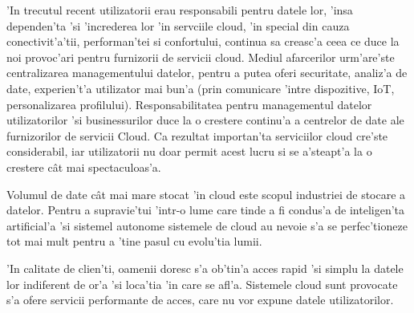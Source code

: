 \documentclass[12pt,a4paper,twoside]{report}
\begin{document}
'In trecutul recent utilizatorii erau responsabili pentru datele lor, 'insa dependen'ta 'si 'increderea lor 'in servciile cloud, 'in special din  cauza conectivit'a'tii, performan'tei si confortului, continua sa creasc'a ceea ce duce la noi provoc'ari pentru furnizorii de servicii cloud. Mediul afarcerilor urm'are'ste centralizarea managementului datelor, pentru a putea oferi securitate, analiz'a de date, experien't'a utilizator mai bun'a (prin comunicare 'intre dispozitive, IoT, personalizarea profilului). Responsabilitatea pentru managementul datelor utilizatorilor 'si businessurilor duce la o crestere continu'a a centrelor de date ale furnizorilor de servicii Cloud. Ca rezultat importan'ta serviciilor cloud cre'ste considerabil, iar utilizatorii nu doar permit acest lucru si se a'steapt'a la o crestere cât mai spectaculoas'a.

Volumul de date cât mai mare stocat 'in cloud este scopul industriei de stocare a datelor.
Pentru a supravie'tui 'intr-o lume care tinde  a fi condus'a de inteligen'ta artificial'a 'si sistemel autonome sistemele de cloud au nevoie s'a se perfec'tioneze tot mai mult pentru a 'tine pasul cu evolu'tia lumii.

'In calitate de clien'ti, oamenii doresc s'a ob'tin'a acces rapid 'si simplu la datele lor indiferent de or'a 'si loca'tia 'in care se afl'a. Sistemele cloud sunt provocate s'a ofere servicii performante de acces, care nu vor expune datele utilizatorilor. 
\end{document}
